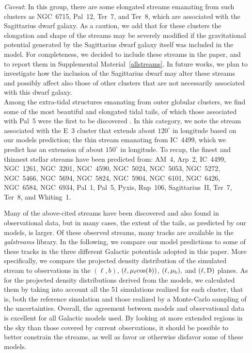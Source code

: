             \textit{Caveat}: In this group, there are some elongated streams emanating from such clusters as NGC~6715, Pal~12, Ter~7, and Ter~8, which are  associated with the Sagittarius dwarf galaxy. As a caution, we add that for these clusters the elongation and shape of the streams may be severely modified if the gravitational potential generated by the Sagittarius dwarf galaxy itself was included in the model. For completeness, we decided to include these streams in the paper, and to report them in Supplemental Material~\ref{allstreams}. In future works, we plan to investigate how the inclusion of the Sagittarius dwarf may alter these streams and possibly affect also those of other clusters that are not necessarily associated with this dwarf galaxy.\\

            Among the extra-tidal structures emanating from outer globular clusters, we find some of the most beautiful and elongated tidal tails, of which those associated with Pal~5 were the first to be discovered \citep{2001ApJ...548L.165O}.  In this category, we note the stream associated with the E~3 cluster that extends about  $120^\circ$  in longitude based on our models prediction; the thin stream emanating from IC~4499, which we predict has an extension of about $150^\circ$ in longitude.  To recap, the finest and thinnest stellar streams have been predicted from: AM~4, Arp~2, IC~4499, NGC~1261, NGC~3201, NGC~4590, NGC~5024, NGC~5053, NGC~5272, NGC~5466, NGC~5694, NGC~5824, NGC~5904, NGC~6101, NGC~6426, NGC~6584, NGC~6934, Pal~1, Pal~5, Pyxis, Rup~106, Sagittarius~II, Ter~7, Ter~8, and Whiting~1.

            Many of the above-cited streams have been discovered and also found  in observational data, but in many cases, the extent of the tails, as predicted by our models, is larger. Of these observed streams, many tracks are available in the \textit{galstreams} \citep{2023MNRAS.520.5225M} library. In the following, we compare our model predictions to some of these tracks in the three different Galactic potentials adopted in this paper. More specifically, we compare the projected density distribution of the simulated stream to observations in the $(\ell, b)$, $(\ell,  \rm \mu_{\ell}cos(\mathit{b}))$, $(\ell, \rm \mu_b),$ and $(\ell, \rm D)$ planes. As for the projected density distributions derived from the models, we calculated them by taking into account all the 51 simulations realized for each cluster, that is, both the reference simulation and those realized by a Monte-Carlo sampling of the uncertainties. Overall, the agreement between models and observational data is excellent for all Galactic models used. By looking at more extended regions in the sky than those covered by current observations, it should be possible to better constrain the streams, as well as favor or otherwise disfavor some of these models.

